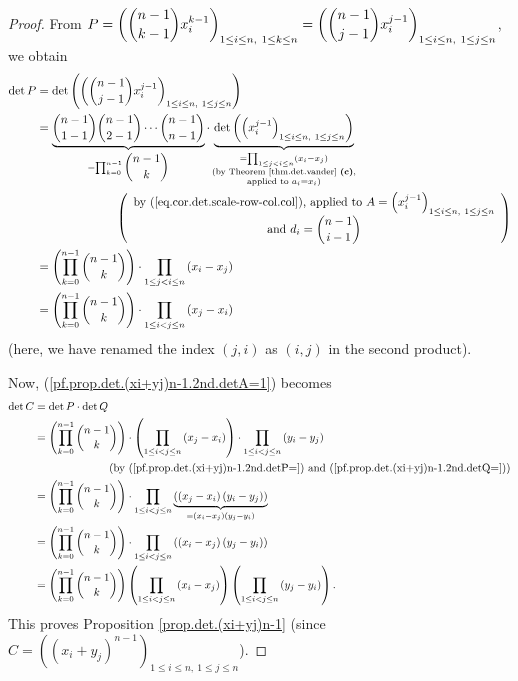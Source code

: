 \begin{proof}
From $P=\left(  \dbinom{n-1}{k-1}x_{i}^{k-1}\right)  _{1\leq i\leq n,\ 1\leq
k\leq n}=\left(  \dbinom{n-1}{j-1}x_{i}^{j-1}\right)  _{1\leq i\leq n,\ 1\leq
j\leq n}$, we obtain%
\begin{align}
\det P  &  =\det\left(  \left(  \dbinom{n-1}{j-1}x_{i}^{j-1}\right)  _{1\leq
i\leq n,\ 1\leq j\leq n}\right) \nonumber\\
&  =\underbrace{\dbinom{n-1}{1-1}\dbinom{n-1}{2-1}\cdots\dbinom{n-1}{n-1}%
}_{=\prod_{k=0}^{n-1}\dbinom{n-1}{k}}\cdot\underbrace{\det\left(  \left(
x_{i}^{j-1}\right)  _{1\leq i\leq n,\ 1\leq j\leq n}\right)  }%
_{\substack{=\prod_{1\leq j<i\leq n}\left(  x_{i}-x_{j}\right)  \\\text{(by
Theorem \ref{thm.det.vander} \textbf{(c)},}\\\text{applied to }a_{i}%
=x_{i}\text{)}}}\nonumber\\
&  \ \ \ \ \ \ \ \ \ \ \ \ \ \ \ \ \ \ \ \ \left(
\begin{array}
[c]{c}%
\text{by (\ref{eq.cor.det.scale-row-col.col}), applied to }A=\left(
x_{i}^{j-1}\right)  _{1\leq i\leq n,\ 1\leq j\leq n}\\
\text{and }d_{i}=\dbinom{n-1}{i-1}%
\end{array}
\right) \nonumber\\
&  =\left(  \prod_{k=0}^{n-1}\dbinom{n-1}{k}\right)  \cdot\prod_{1\leq j<i\leq
n}\left(  x_{i}-x_{j}\right) \nonumber\\
&  =\left(  \prod_{k=0}^{n-1}\dbinom{n-1}{k}\right)  \cdot\prod_{1\leq i<j\leq
n}\left(  x_{j}-x_{i}\right)  \label{pf.prop.det.(xi+yj)n-1.2nd.detP=}%
\end{align}
(here, we have renamed the index $\left(  j,i\right)  $ as $\left(
i,j\right)  $ in the second product).

Now, (\ref{pf.prop.det.(xi+yj)n-1.2nd.detA=1}) becomes%
\begin{align*}
\det C  &  =\det P\cdot\det Q\\
&  =\left(  \prod_{k=0}^{n-1}\dbinom{n-1}{k}\right)  \cdot\left(  \prod_{1\leq
i<j\leq n}\left(  x_{j}-x_{i}\right)  \right)  \cdot\prod_{1\leq i<j\leq
n}\left(  y_{i}-y_{j}\right) \\
&  \ \ \ \ \ \ \ \ \ \ \ \ \ \ \ \ \ \ \ \ \left(  \text{by
(\ref{pf.prop.det.(xi+yj)n-1.2nd.detP=}) and
(\ref{pf.prop.det.(xi+yj)n-1.2nd.detQ=})}\right) \\
&  =\left(  \prod_{k=0}^{n-1}\dbinom{n-1}{k}\right)  \cdot\prod_{1\leq i<j\leq
n}\underbrace{\left(  \left(  x_{j}-x_{i}\right)  \left(  y_{i}-y_{j}\right)
\right)  }_{=\left(  x_{i}-x_{j}\right)  \left(  y_{j}-y_{i}\right)  }\\
&  =\left(  \prod_{k=0}^{n-1}\dbinom{n-1}{k}\right)  \cdot\prod_{1\leq i<j\leq
n}\left(  \left(  x_{i}-x_{j}\right)  \left(  y_{j}-y_{i}\right)  \right) \\
&  =\left(  \prod_{k=0}^{n-1}\dbinom{n-1}{k}\right)  \left(  \prod_{1\leq
i<j\leq n}\left(  x_{i}-x_{j}\right)  \right)  \left(  \prod_{1\leq i<j\leq
n}\left(  y_{j}-y_{i}\right)  \right)  .
\end{align*}
This proves Proposition \ref{prop.det.(xi+yj)n-1} (since $C=\left(  \left(
x_{i}+y_{j}\right)  ^{n-1}\right)  _{1\leq i\leq n,\ 1\leq j\leq n}$).
\end{proof}

